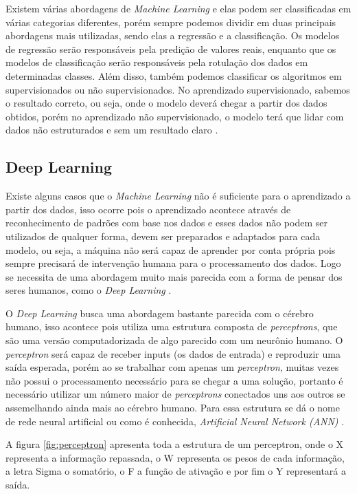 Existem várias abordagens de \emph{Machine Learning} e elas podem ser classificadas em várias categorias diferentes, porém sempre podemos dividir em duas principais abordagens mais utilizadas, sendo elas a regressão e a classificação. Os modelos de regressão serão responsáveis pela predição de valores reais, enquanto que os modelos de classificação serão responsáveis pela rotulação dos dados em determinadas classes. Além disso, também podemos classificar os algoritmos em supervisionados ou não supervisionados. No aprendizado supervisionado, sabemos o resultado correto, ou seja, onde o modelo deverá chegar a partir dos dados obtidos, porém no aprendizado não supervisionado, o modelo terá que lidar com dados não estruturados e sem um resultado claro \cite{machineLearningPython}.

\subsection{Deep Learning}
Existe alguns casos que o \emph{Machine Learning} não é suficiente para o aprendizado a partir dos dados, isso ocorre pois o aprendizado acontece através de reconhecimento de padrões com base nos dados e esses dados não podem ser utilizados de qualquer forma, devem ser preparados e adaptados para cada modelo, ou seja, a máquina não será capaz de aprender por conta própria pois sempre precisará de intervenção humana para o processamento dos dados. Logo se necessita de uma abordagem muito mais parecida com a forma de pensar dos seres humanos, como o \emph{Deep Learning} \cite{deepLearningPython, deepLearningTensorFlow}.

O \emph{Deep Learning} busca uma abordagem bastante parecida com o cérebro humano, isso acontece pois utiliza uma estrutura composta de \emph{perceptrons}, que são uma versão computadorizada de algo parecido com um neurônio humano. O \emph{perceptron} será capaz de receber inputs (os dados de entrada) e reproduzir uma saída esperada, porém ao se trabalhar com apenas um \emph{perceptron}, muitas vezes não possui o processamento necessário para se chegar a uma solução, portanto é necessário utilizar um número maior de \emph{perceptrons} conectados uns aos outros se assemelhando ainda mais ao cérebro humano. Para essa estrutura se dá o nome de rede neural artificial ou como é conhecida, \emph{Artificial Neural Network (ANN)} \cite{deepLearning, deepLearningTensorFlow}.

A figura \ref{fig:perceptron} apresenta toda a estrutura de um perceptron, onde o X representa a informação repassada, o W representa os pesos de cada informação, a letra Sigma o somatório, o F a função de ativação e por fim o Y representará a saída.

